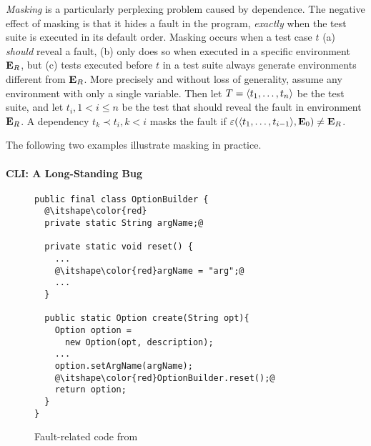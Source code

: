 \emph{Masking} is a particularly perplexing problem caused by
dependence.
The negative effect of masking is that it hides a fault in the
program, \emph{exactly} when the test suite is executed in its default
order. 
Masking occurs when a test case $t$ (a) \emph{should}
reveal a fault, (b) only does so when executed in a specific environment
$\mathbf{E}_R$, but (c) tests executed before $t$ in a test suite always
generate environments different from
$\mathbf{E}_R$.
More precisely and without loss of generality, assume any
environment with only a single variable. Then let $T =
 \langle t_1,\dots,t_n \rangle $ be the test suite, and let $t_i, 1 < i \leq n$
be the test that should reveal the fault in environment $\mathbf{E}_R$. A
dependency $t_k \prec t_i, k < i$ masks the fault if
$\varepsilon( \langle t_1,\dots,t_{i-1} \rangle ,\mathbf{E}_0) \neq \mathbf{E}_R$.

The following two examples illustrate masking in
practice.

\paragraph{CLI: A Long-Standing Bug}

\begin{figure}
\begin{lstlisting}
public final class OptionBuilder {
  @\itshape\color{red}
  private static String argName;@
  
  private static void reset() {
    ...
    @\itshape\color{red}argName = "arg";@
    ...
  }
   
  public static Option create(String opt){
    Option option = 
      new Option(opt, description);
    ...
    option.setArgName(argName);
    @\itshape\color{red}OptionBuilder.reset();@
    return option;
  }
}
\end{lstlisting}
\caption{Fault-related code from }
\label{fig:option_builder}
\end{figure}

